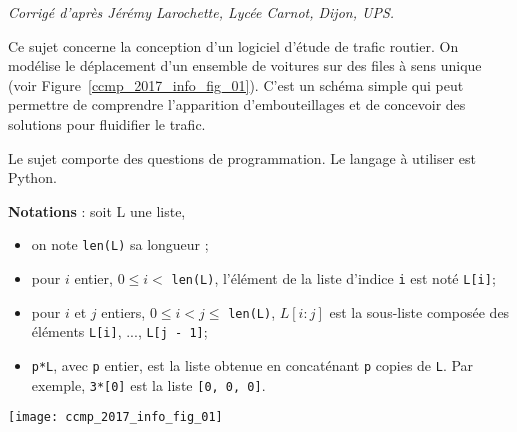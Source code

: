 



\ifprof
\textit{Corrigé d'après Jérémy Larochette, Lycée Carnot, Dijon, UPS.}
\else
\fi

\ifprof
\else
Ce sujet concerne la conception d'un logiciel d'étude de trafic routier. On modélise le déplacement d'un ensemble de voitures sur des files à sens unique (voir Figure~\ref{ccmp_2017_info_fig_01}). C'est un schéma simple qui peut permettre de comprendre l'apparition d'embouteillages et de concevoir des solutions pour fluidifier le trafic.

Le sujet comporte des questions de programmation. Le langage à utiliser est Python.

\textbf{Notations} :
soit L une liste,
\begin{itemize}
    \item[\textbullet] on note \lstinline{len(L)} sa longueur ;
    \item[\textbullet]  pour $i$ entier, $0 \leqslant  i <$ \lstinline{len(L)}, l'élément de la liste d'indice \lstinline{i} est noté \lstinline{L[i]};
    \item[\textbullet]   pour $i$ et $j$ entiers, $0 \leqslant i < j \leqslant $ \lstinline{len(L)}, $L[i : j]$ est la sous-liste composée des éléments \lstinline{L[i]},
..., \lstinline{L[j - 1]};
    \item[\textbullet]  \lstinline{p*L}, avec \lstinline{p} entier, est la liste obtenue en concaténant \lstinline{p} copies de \lstinline{L}. Par exemple, \lstinline{3*[0]} est
la liste \lstinline{[0, 0, 0]}.
\end{itemize}



\begin{center}


\texttt{[image: ccmp\_2017\_info\_fig\_01]}
	
\end{center}

